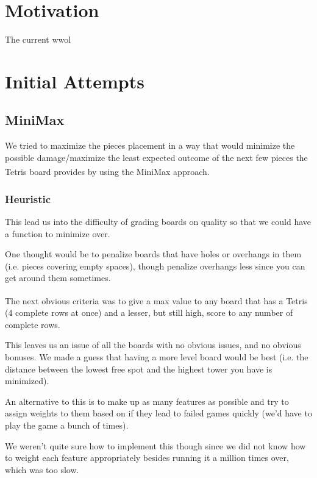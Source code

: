 \documentclass[ fontsize=11pt]{article}
\def\tetris{Tetris\textsuperscript{\textregistered}}
\begin{document}
\section{Motivation}
\label{sec:motivation}
The current wwol


\section{Initial Attempts}
\label{sec:initial_attempts}

\subsection{MiniMax}
\par We tried to maximize the pieces placement in a way that would minimize the possible damage/maximize the least expected outcome of the next few pieces the \tetris{} board provides by using the MiniMax approach.
\subsubsection{Heuristic}
\par This lead us into the difficulty of grading boards on quality so that we could have a function to minimize over.

\par One thought would be to penalize boards that have holes or overhangs in them (i.e. pieces covering empty spaces), though penalize overhangs less since you can get around them sometimes.

\par The next obvious criteria was to give a max value to any board that has a \tetris{} (4 complete rows at once) and a lesser, but still high, score to any number of complete rows.

\par This leaves us an issue of all the boards with no obvious issues, and no obvious bonuses. We made a guess that having a more level board would be best (i.e. the distance between the lowest free spot and the highest tower you have is minimized).

\par An alternative to this is to make up as many features as possible and try to assign weights to them based on if they lead to failed games quickly (we'd have to play the game a bunch of times).

\par We weren't quite sure how to implement this though since we did not know how to weight each feature appropriately besides running it a million times over, which was too slow.
\end{document}
